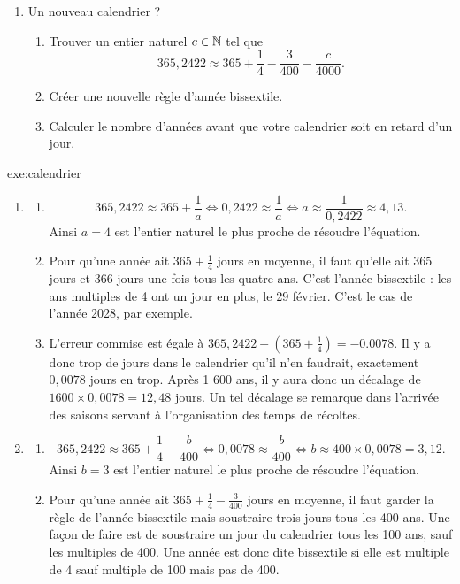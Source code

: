 {\begin{enumerate}
\begin{enumerate}
		\item
		Au bout de combien d'années le calendrier est-il en retard d'un jour ?
	\end{enumerate}
	
	\item
	Un nouveau calendrier ?
	\begin{enumerate}
		\item
		Trouver un entier naturel $c \in \mathbb{N}$ tel que
			\[ 365,2422 \approx 365 + \frac14 - \frac{3}{400} - \frac{c}{4000}.\]

		\item 
		Créer une nouvelle règle d'année bissextile.
		\item
		Calculer le nombre d'années avant que votre calendrier soit en retard d'un jour.
	\end{enumerate}
	\end{enumerate}
}{exe:calendrier}{
	\begin{enumerate}
		\item
		\begin{enumerate}
			\item
				\[ 365,2422 \approx 365 + \frac1a \iff 0,2422 \approx \frac1a \iff a \approx \frac1{0,2422} \approx 4,13. \]
			Ainsi $a=4$ est l'entier naturel le plus proche de résoudre l'équation.
			\item
			Pour qu'une année ait $365 + \frac14$ jours en moyenne, il faut qu'elle ait $365$ jours et $366$ jours une fois tous les quatre ans.
			C'est l'année bissextile : les ans multiples de 4 ont un jour en plus, le 29 février.
			C'est le cas de l'année 2028, par exemple.
			
			\item
			L'erreur commise est égale à $365,2422 - (365 + \frac14) = -0.0078$.
			Il y a donc trop de jours dans le calendrier qu'il n'en faudrait, exactement $0,0078$ jours en trop.
			Après 1 600 ans, il y aura donc un décalage de $1600 \times 0,0078 = 12,48$ jours.
			Un tel décalage se remarque dans l'arrivée des saisons servant à l'organisation des temps de récoltes.
		\end{enumerate}
		\item
		\begin{enumerate}
			\item
				\[ 365,2422 \approx 365 + \frac14 - \frac{b}{400} \iff 0,0078 \approx \frac{b}{400} \iff b \approx 400\times0,0078 = 3,12. \]
			Ainsi $b=3$ est l'entier naturel le plus proche de résoudre l'équation.
			\item
			Pour qu'une année ait $365 + \frac14 - \frac3{400}$ jours en moyenne, il faut garder la règle de l'année bissextile mais soustraire trois jours tous les 400 ans.
			Une façon de faire est de soustraire un jour du calendrier tous les 100 ans, sauf les multiples de 400.
			Une année est donc dite bissextile si elle est multiple de 4 sauf multiple de 100 mais pas de 400.
			

\end{enumerate}
\end{enumerate}}
